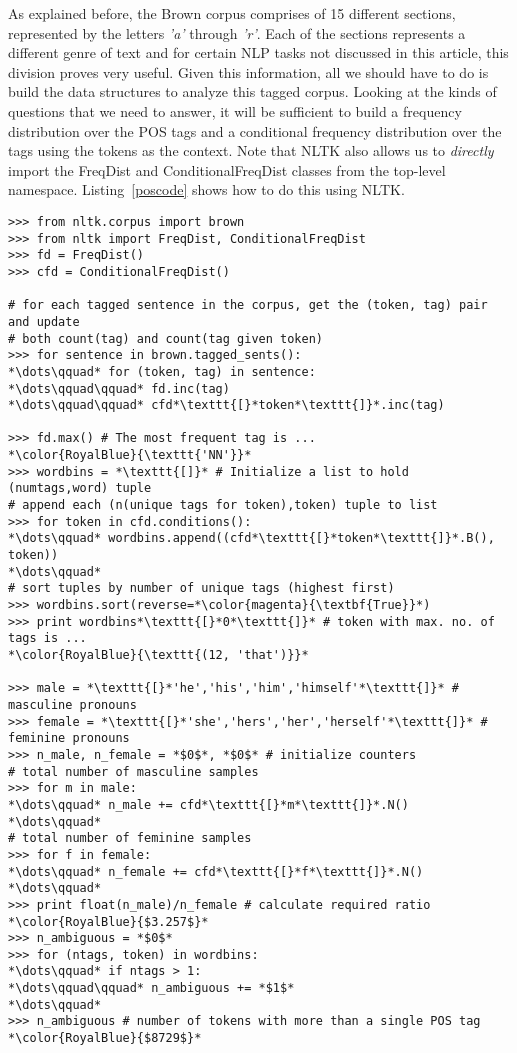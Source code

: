 \documentclass[11pt]{article}
\begin{document}
As explained before, the Brown corpus comprises of 15 different sections, represented by the letters \emph{'a'} through \emph{'r'}. Each of the sections represents a different genre of text and for certain NLP tasks not discussed in this article, this division proves very useful. Given this information, all we should have to do is build the data structures to analyze this tagged corpus. Looking at the kinds of questions that we need to answer, it will be sufficient to build a frequency distribution over the POS tags and a conditional frequency distribution over the tags using the tokens as the context. Note that NLTK also allows us to \emph{directly} import the FreqDist and ConditionalFreqDist classes from the top-level namespace. Listing~\ref{poscode} shows how to do this using NLTK.\\

\begin{lstlisting}[float,caption=Analyzing tagged corpora using NLTK.,label=poscode,frame=trBL,framexrightmargin=25pt,escapechar=*]
>>> from nltk.corpus import brown
>>> from nltk import FreqDist, ConditionalFreqDist
>>> fd = FreqDist()
>>> cfd = ConditionalFreqDist()

# for each tagged sentence in the corpus, get the (token, tag) pair and update
# both count(tag) and count(tag given token)
>>> for sentence in brown.tagged_sents():
*\dots\qquad* for (token, tag) in sentence:
*\dots\qquad\qquad* fd.inc(tag)
*\dots\qquad\qquad* cfd*\texttt{[}*token*\texttt{]}*.inc(tag)

>>> fd.max() # The most frequent tag is ...
*\color{RoyalBlue}{\texttt{'NN'}}*
>>> wordbins = *\texttt{[]}* # Initialize a list to hold (numtags,word) tuple
# append each (n(unique tags for token),token) tuple to list
>>> for token in cfd.conditions():
*\dots\qquad* wordbins.append((cfd*\texttt{[}*token*\texttt{]}*.B(), token))
*\dots\qquad*
# sort tuples by number of unique tags (highest first)
>>> wordbins.sort(reverse=*\color{magenta}{\textbf{True}}*)
>>> print wordbins*\texttt{[}*0*\texttt{]}* # token with max. no. of tags is ...
*\color{RoyalBlue}{\texttt{(12, 'that')}}*

>>> male = *\texttt{[}*'he','his','him','himself'*\texttt{]}* # masculine pronouns
>>> female = *\texttt{[}*'she','hers','her','herself'*\texttt{]}* # feminine pronouns
>>> n_male, n_female = *$0$*, *$0$* # initialize counters
# total number of masculine samples
>>> for m in male:
*\dots\qquad* n_male += cfd*\texttt{[}*m*\texttt{]}*.N()
*\dots\qquad*
# total number of feminine samples
>>> for f in female:
*\dots\qquad* n_female += cfd*\texttt{[}*f*\texttt{]}*.N()
*\dots\qquad*
>>> print float(n_male)/n_female # calculate required ratio
*\color{RoyalBlue}{$3.257$}*
>>> n_ambiguous = *$0$*
>>> for (ntags, token) in wordbins:
*\dots\qquad* if ntags > 1:
*\dots\qquad\qquad* n_ambiguous += *$1$*
*\dots\qquad*
>>> n_ambiguous # number of tokens with more than a single POS tag
*\color{RoyalBlue}{$8729$}*
\end{lstlisting}
\end{document}
